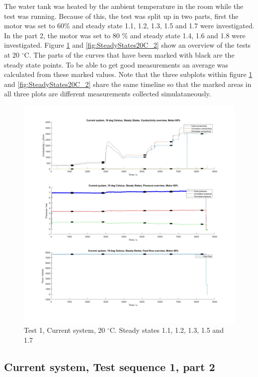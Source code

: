 The water tank was heated by the ambient temperature in the room while the test was running. Because of this, the test was split up in two parts, first the motor was set to 60\% and steady state 1.1, 1.2, 1.3, 1.5 and 1.7 were investigated. In the part 2, the motor was set to 80 \% and steady state 1.4, 1.6 and 1.8 were investigated. Figure \ref{fig:SteadyStates20C_1} and  \ref{fig:SteadyStates20C_2} show an overview of the tests at 20 $^{\circ}$C. The parts of the curves that have been marked with black are the steady state points. To be able to get good measurements an average was calculated from these marked values. Note that the three subplots within figure  \ref{fig:SteadyStates20C_1} and  \ref{fig:SteadyStates20C_2} share the same timeline so that the marked areas in all three plots are different measurements collected simulataneously.

\begin{figure}[h]
    \centering
    \includegraphics[width=1\textwidth]{overview20_60}
    \caption{Test 1, Current system, 20 $^{\circ}$C. Steady states 1.1, 1.2, 1.3, 1.5 and 1.7 }
    \label{fig:SteadyStates20C_1}
\end{figure}

\newpage

\subsection{Current system, Test sequence 1, part 2}
  
